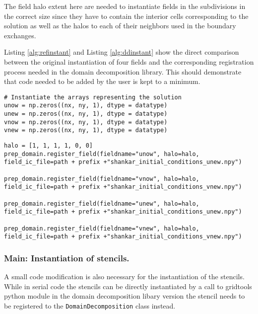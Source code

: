The field halo extent here are needed to instantiate fields in the subdivisions in the correct size since they have to contain the interior cells corresponding to the solution as well as the halos to each of their neighbors used in the boundary exchanges.

Listing \ref{alg:refinstant} and Listing \ref{alg:ddinstant} show the direct comparison between the original instantiation of four fields and the corresponding registration process needed in the domain decomposition library.
This should demonstrate that code needed to be added by the user is kept to a minimum.

\begin{lstlisting}[caption={Example code for the original user field instantiation.},captionpos=b, label={alg:refinstant}, float, floatplacement=H]
# Instantiate the arrays representing the solution
unow = np.zeros((nx, ny, 1), dtype = datatype)
unew = np.zeros((nx, ny, 1), dtype = datatype)
vnow = np.zeros((nx, ny, 1), dtype = datatype)
vnew = np.zeros((nx, ny, 1), dtype = datatype)
\end{lstlisting} 

\begin{lstlisting}[caption={Example code for the same field instantiation using the domain decomposition library.},captionpos=b, label={alg:ddinstant}, float, floatplacement=H]
halo = [1, 1, 1, 1, 0, 0]
prep_domain.register_field(fieldname="unow", halo=halo, field_ic_file=path + prefix +"shankar_initial_conditions_unew.npy")

prep_domain.register_field(fieldname="vnow", halo=halo, field_ic_file=path + prefix +"shankar_initial_conditions_vnew.npy")

prep_domain.register_field(fieldname="unew", halo=halo, field_ic_file=path + prefix +"shankar_initial_conditions_unew.npy")

prep_domain.register_field(fieldname="vnew", halo=halo, field_ic_file=path + prefix +"shankar_initial_conditions_vnew.npy")
\end{lstlisting}

\subsubsection{Main: Instantiation of stencils.}
A small code modification is also necessary for the instantiation of the stencils.
While in serial code the stencils can be directly instantiated by a call to gridtools python module in the domain decomposition libary version the stencil needs to be registered to the \texttt{DomainDecomposition} class instead.

